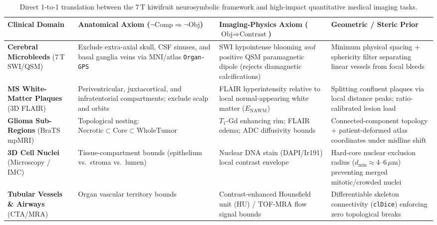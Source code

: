 \documentclass[10pt,a4paper]{article}
\renewcommand{\_}{\origunderscore\allowbreak}
\begin{document}
\begin{table}[htbp]
\centering
\caption[Direct clinical translation across quantitative imaging domains]{Direct 1-to-1 translation between the 7\,T kiwifruit neurosymbolic framework and high-impact quantitative medical imaging tasks.}
\label{tab:clinical_translation}
{\footnotesize
\setlength{\tabcolsep}{4pt}
\renewcommand{\arraystretch}{1.26}
\begin{tabularx}{\textwidth}{L{2.75cm} L{3.95cm} L{4.15cm} Y}
\toprule
{}\textbf{Clinical Domain} & \textbf{Anatomical Axiom ($\neg\text{Comp} \Rightarrow \neg\text{Obj}$)} & \textbf{Imaging-Physics Axiom ($\text{Obj} \Rightarrow \text{Contrast}$)} & \textbf{Geometric / Steric Prior} \\
\midrule
\textbf{Cerebral Microbleeds} (7\,T SWI/QSM)~\cite{greenberg2009cmb} & Exclude extra-axial skull, CSF sinuses, and basal ganglia veins via MNI/atlas \texttt{Organ-GPS} & SWI hypointense blooming \emph{and} positive QSM paramagnetic dipole (rejects diamagnetic calcifications) & Minimum physical spacing + sphericity filter separating linear vessels from focal bleeds \\
\textbf{MS White-Matter Plaques} (3D FLAIR)~\cite{thompson2018mcdonald} & Periventricular, juxtacortical, and infratentorial compartments; exclude scalp and orbits & FLAIR hyperintensity relative to local normal-appearing white matter ($E_{\text{NAWM}}$) & Splitting confluent plaques via local distance peaks; ratio-calibrated lesion load \\
\textbf{Glioma Sub-Regions} (BraTS mpMRI)~\cite{menze2015brats} & Topological nesting: $\text{Necrotic} \subset \text{Core} \subset \text{WholeTumor}$~\cite{hu2019topology} & $T_1$-Gd enhancing rim; FLAIR edema; ADC diffusivity bounds & Connected-component topology + patient-deformed atlas coordinates under midline shift \\
\textbf{3D Cell Nuclei} (Microscopy / IMC)~\cite{weigert2020stardist3d,stringer2021cellpose} & Tissue-compartment bounds (epithelium vs.\ stroma vs.\ lumen) & Nuclear DNA stain (DAPI/Ir191) local contrast envelope & Hard-core nuclear exclusion radius ($d_{\min} \approx 4\text{--}6\,\mu\text{m}$) preventing merged mitotic/crowded nuclei \\
\textbf{Tubular Vessels \& Airways} (CTA/MRA)~\cite{shit2021cldice} & Organ vascular territory bounds & Contrast-enhanced Hounsfield unit (HU) / TOF-MRA flow signal bounds & Differentiable skeleton connectivity (\texttt{clDice}) enforcing zero topological breaks \\
\bottomrule
\end{tabularx}
}
\end{table}
\end{document}
